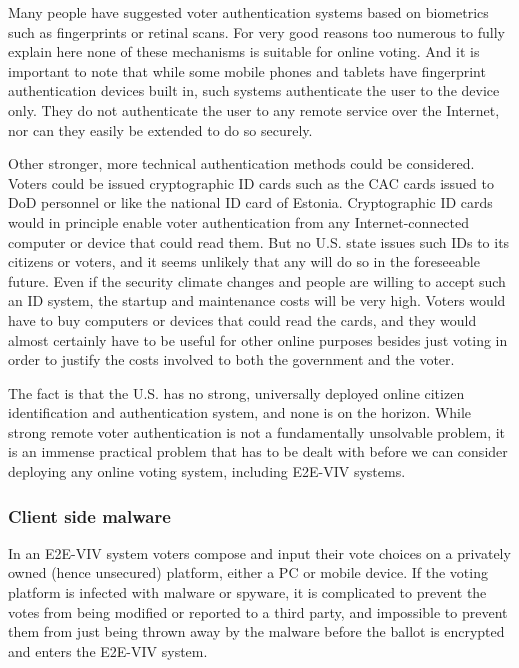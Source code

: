 Many people have suggested voter authentication systems based on
biometrics such as fingerprints or retinal scans. For very good
reasons too numerous to fully explain here none of these mechanisms is
suitable for online voting. And it is important to note that while
some mobile phones and tablets have fingerprint authentication devices
built in, such systems authenticate the user to the device only. They
do not authenticate the user to any remote service over the Internet,
nor can they easily be extended to do so securely.

Other stronger, more technical authentication methods could be
considered.  Voters could be issued cryptographic ID cards such as the
CAC cards issued to DoD personnel or like the national ID card of
Estonia. Cryptographic ID cards would in principle enable voter
authentication from any Internet-connected computer or device that
could read them. But no U.S. state issues such IDs to its citizens or
voters, and it seems unlikely that any will do so in the foreseeable
future. Even if the security climate changes and people are willing to
accept such an ID system, the startup and maintenance costs will be
very high.  Voters would have to buy computers or devices that could
read the cards, and they would almost certainly have to be useful for
other online purposes besides just voting in order to justify the
costs involved to both the government and the voter.

The fact is that the U.S. has no strong, universally deployed online
citizen identification and authentication system, and none is on the
horizon. While strong remote voter authentication is not a
fundamentally unsolvable problem, it is an immense practical problem
that has to be dealt with before we can consider deploying any online
voting system, including E2E-VIV systems.

\subsubsection{Client side malware}

In an E2E-VIV system voters compose and input their vote choices on a
privately owned (hence unsecured) platform, either a PC or mobile
device. If the voting platform is infected with malware or spyware, it
is complicated to prevent the votes from being modified or reported to
a third party, and impossible to prevent them from just being thrown
away by the malware before the ballot is encrypted and enters the
E2E-VIV system.

